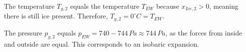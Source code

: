 The temperature \( T_{g,2} \) equals the temperature \( T_{EW} \) because \( x_{Ice,2} > 0 \), meaning there is still ice present. Therefore, \( T_{g,2} = 0^\circ C = T_{EW} \).  

The pressure \( p_{g,2} \) equals \( p_{EW} = 740-744 \, Pa \approx 744 \, Pa \), as the forces from inside and outside are equal. This corresponds to an isobaric expansion.
